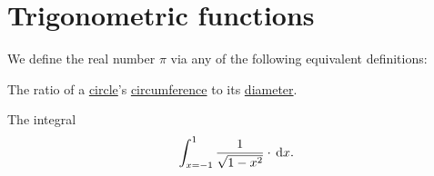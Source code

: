 \section{Trigonometric functions}\label{sec:trigonometric_functions}

\begin{definition}\label{def:pi}
  We define the real number \( \pi \) via any of the following equivalent definitions:
  \begin{thmenum}
     The ratio of a \hyperref[def:circle]{circle}'s \hyperref[def:circumference]{circumference} to its \hyperref[def:metric_space/diameter]{diameter}.

     The integral
    \begin{equation}\label{eq:def:pi/integral}
      \int_{x=-1}^1 \frac 1 { \sqrt{1 - x^2} } \cdot \dl x.
    \end{equation}
  \end{thmenum}
\end{definition}
